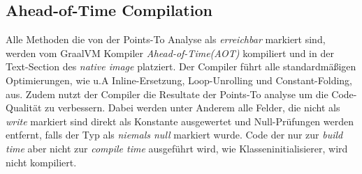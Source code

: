\subsection{Ahead-of-Time Compilation}
\label{subsec:aotc}

Alle Methoden die von der Points-To Analyse als \textit{erreichbar} markiert sind, werden vom GraalVM Kompiler \textit{Ahead-of-Time(AOT)}
kompiliert und in der Text-Section des \textit{native image} platziert. Der Compiler führt alle standardmäßigen Optimierungen, wie u.A Inline-Ersetzung, Loop-Unrolling und Constant-Folding, aus.
Zudem nutzt der Compiler die Resultate der Points-To analyse um die Code-Qualität zu verbessern. Dabei werden unter Anderem alle Felder, die nicht als \textit{write} markiert sind direkt als Konstante ausgewertet und Null-Prüfungen werden entfernt, falls der Typ als \textit{niemals null}  markiert wurde.
Code der nur zur \textit{build time} aber nicht zur \textit{compile time} ausgeführt wird, wie Klasseninitialisierer, wird nicht kompiliert.

